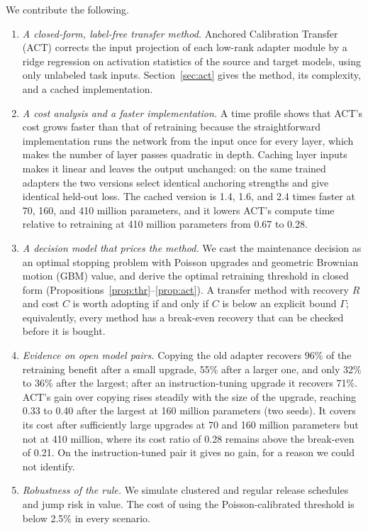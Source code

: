 \documentclass[preprint,12pt,authoryear]{elsarticle}
\begin{document}
We contribute the following.
\begin{enumerate}
\item \emph{A closed-form, label-free transfer method.} Anchored Calibration Transfer (ACT) corrects the input projection of each low-rank adapter module by a ridge regression on activation statistics of the source and target models, using only unlabeled task inputs. Section~\ref{sec:act} gives the method, its complexity, and a cached implementation.
\item \emph{A cost analysis and a faster implementation.} A time profile shows that ACT's cost grows faster than that of retraining because the straightforward implementation runs the network from the input once for every layer, which makes the number of layer passes quadratic in depth. Caching layer inputs makes it linear and leaves the output unchanged: on the same trained adapters the two versions select identical anchoring strengths and give identical held-out loss. The cached version is 1.4, 1.6, and 2.4 times faster at 70, 160, and 410 million parameters, and it lowers ACT's compute time relative to retraining at 410 million parameters from 0.67 to 0.28.
\item \emph{A decision model that prices the method.} We cast the maintenance decision as an optimal stopping problem with Poisson upgrades and geometric Brownian motion (GBM) value, and derive the optimal retraining threshold in closed form (Propositions~\ref{prop:thr}--\ref{prop:act}). A transfer method with recovery $R$ and cost $C$ is worth adopting if and only if $C$ is below an explicit bound $\Gamma$; equivalently, every method has a break-even recovery that can be checked before it is bought.
\item \emph{Evidence on open model pairs.} Copying the old adapter recovers 96\% of the retraining benefit after a small upgrade, 55\% after a larger one, and only 32\% to 36\% after the largest; after an instruction-tuning upgrade it recovers 71\%. ACT's gain over copying rises steadily with the size of the upgrade, reaching 0.33 to 0.40 after the largest at 160 million parameters (two seeds). It covers its cost after sufficiently large upgrades at 70 and 160 million parameters but not at 410 million, where its cost ratio of 0.28 remains above the break-even of 0.21. On the instruction-tuned pair it gives no gain, for a reason we could not identify.
\item \emph{Robustness of the rule.} We simulate clustered and regular release schedules and jump risk in value. The cost of using the Poisson-calibrated threshold is below 2.5\% in every scenario.
\end{enumerate}
\end{document}
